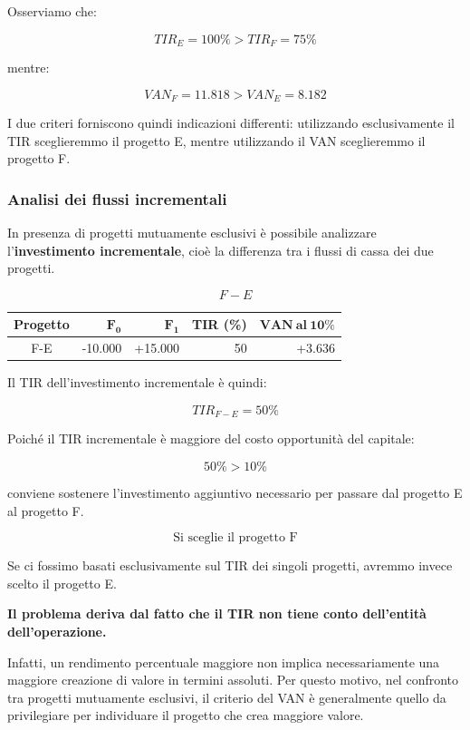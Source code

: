 \noindent Osserviamo che:

\[
TIR_E = 100\% > TIR_F = 75\%
\]

\noindent mentre:

\[
VAN_F = 11.818 > VAN_E = 8.182
\]

\noindent I due criteri forniscono quindi indicazioni differenti:
utilizzando esclusivamente il TIR sceglieremmo il progetto E, mentre
utilizzando il VAN sceglieremmo il progetto F.

\subsubsection*{Analisi dei flussi incrementali}

\noindent In presenza di progetti mutuamente esclusivi è possibile analizzare
l'\textbf{investimento incrementale}, cioè la differenza tra i flussi di cassa
dei due progetti.

\[
F-E
\]

\begin{center}
\begin{tabular}{c|rrrr}
\textbf{Progetto} & $\mathbf{F_0}$ & $\mathbf{F_1}$ &
\textbf{TIR (\%)} & $\mathbf{VAN\ al\ 10\%}$ \\
\hline
F-E & -10.000 & +15.000 & 50 & +3.636
\end{tabular}
\end{center}

\noindent Il TIR dell'investimento incrementale è quindi:

\[
TIR_{F-E}=50\%
\]

\noindent Poiché il TIR incrementale è maggiore del costo opportunità
del capitale:

\[
50\% > 10\%
\]

\noindent conviene sostenere l'investimento aggiuntivo necessario per passare
dal progetto E al progetto F.

\[
\boxed{\text{Si sceglie il progetto F}}
\]

\noindent Se ci fossimo basati esclusivamente sul TIR dei singoli progetti,
avremmo invece scelto il progetto E.

\medskip

\noindent\textbf{Il problema deriva dal fatto che il TIR non tiene conto
dell'entità dell'operazione.}

\noindent Infatti, un rendimento percentuale maggiore non implica
necessariamente una maggiore creazione di valore in termini assoluti.
Per questo motivo, nel confronto tra progetti mutuamente esclusivi,
il criterio del VAN è generalmente quello da privilegiare per individuare
il progetto che crea maggiore valore.


